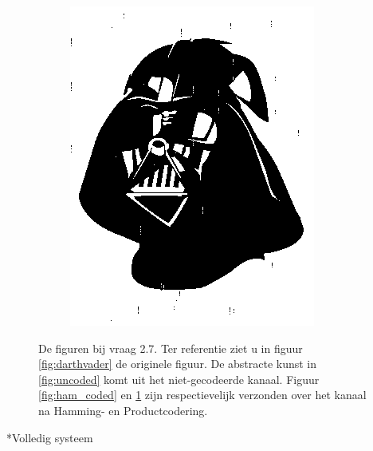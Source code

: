\documentclass[]{article}
\begin{document}
\begin{section}
\begin{subsection}
\begin{figure}
\begin{subfigure}{0.4\textwidth}
                \includegraphics[width=\textwidth]{prod_coded.png}
                \caption{}
                \label{fig:prod_coded}
            \end{subfigure}

            \caption{De figuren bij vraag 2.7. Ter referentie ziet u in figuur
                \ref{fig:darthvader} de originele figuur. De abstracte kunst in
                \ref{fig:uncoded} komt uit het niet-gecodeerde kanaal. Figuur
                \ref{fig:ham_coded} en \ref{fig:prod_coded} zijn
                respectievelijk verzonden over het kanaal na Hamming- en
            Productcodering.}

            \label{fig:2_7}

        \end{figure}

    \end{subsection}

\end{section}

\begin{section}*{Volledig systeem} %
\end{section}
\end{document}

